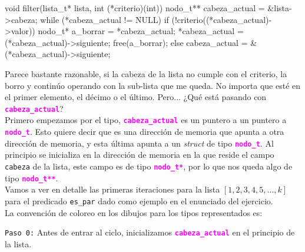 \documentclass[]{scrartcl}
\newcommand{\hl}[1]{\textcolor{magenta}{\textbf{\texttt{#1}}}}
\begin{document}
\begin{cbox}[unbreakable]{}
void filter(lista_t* lista, int (*criterio)(int)) {
    nodo_t** cabeza_actual = &lista->cabeza;
    while (*cabeza_actual != NULL) {
        if (!criterio((*cabeza_actual)->valor)) {
            nodo_t* a_borrar = *cabeza_actual;
            *cabeza_actual = (*cabeza_actual)->siguiente;
            free(a_borrar);
        } else {
            cabeza_actual = &(*cabeza_actual)->siguiente;
        }
    }
}
\end{cbox}

Parece bastante razonable, si la cabeza de la lista no cumple con el criterio, la borro y continúo operando con la sub-lista que me queda. No importa que esté en el primer elemento, el décimo o el último. Pero... ¿Qué está pasando con \hl{cabeza\_actual}? \\

Primero empezamos por el tipo, \hl{cabeza\_actual} es un puntero a un puntero a \hl{nodo\_t}. Esto quiere decir que es una dirección de memoria que apunta a otra dirección de memoria, y esta última apunta a un \textit{struct} de tipo \hl{nodo\_t}. Al principio se inicializa en la dirección de memoria en la que reside el campo \texttt{cabeza} de la lista, este campo es de tipo \hl{nodo\_t*}, por lo que nos queda algo de tipo \hl{nodo\_t**}. \\

Vamos a ver en detalle las primeras iteraciones para la lista $[1,2,3,4,5,..., k]$ para el predicado \texttt{es\_par} dado como ejemplo en el enunciado del ejercicio. \\

La convención de coloreo en los dibujos para los tipos representados es: \\

\begin{center}
  \noindent {}
\end{center}

\newpage

\texttt{Paso 0:} Antes de entrar al ciclo, inicializamos \hl{cabeza\_actual} en el principio de la lista.
\end{document}
